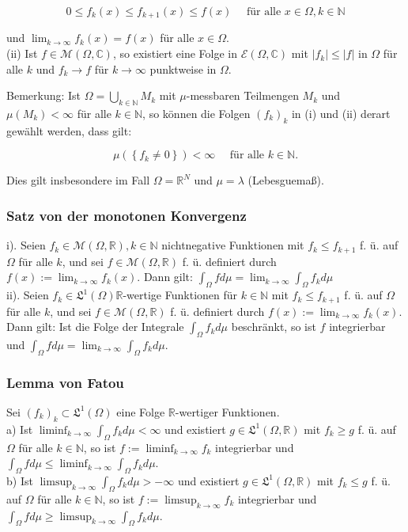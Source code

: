 \documentclass[10pt, letterpaper]{article}
\begin{document}
$$
0 \leq f_{k}(x) \leq f_{k+1}(x) \leq f(x) \quad \text { für alle } x \in \Omega, k \in \mathbb{N}
$$

und $\lim _{k \rightarrow \infty} f_{k}(x)=f(x)$ für alle $x \in \Omega$.\\
(ii) Ist $f \in \mathcal{M}(\Omega, \mathbb{C})$, so existiert eine Folge in $\mathcal{E}(\Omega, \mathbb{C})$ mit $\left|f_{k}\right| \leq|f|$ in $\Omega$ für alle $k$ und $f_{k} \rightarrow f$ für $k \rightarrow \infty$ punktweise in $\Omega$.

Bemerkung: Ist $\Omega=\bigcup_{k \in \mathbb{N}} M_{k}$ mit $\mu$-messbaren Teilmengen $M_{k}$ und $\mu\left(M_{k}\right)<\infty$ für alle $k \in \mathbb{N}$, so können die Folgen $\left(f_{k}\right)_{k}$ in (i) und (ii) derart gewählt werden, dass gilt:

$$
\mu\left(\left\{f_{k} \neq 0\right\}\right)<\infty \quad \text { für alle } k \in \mathbb{N} .
$$

Dies gilt insbesondere im Fall $\Omega=\mathbb{R}^{N}$ und $\mu=\lambda$ (Lebesguemaß).

\subsubsection*{Satz von der monotonen Konvergenz}
i). Seien $f_{k} \in \mathcal{M}(\Omega, \mathbb{R}), k \in \mathbb{N}$ nichtnegative Funktionen mit $f_{k} \leq f_{k+1}$ f. ü. auf $\Omega$ für alle $k$, und sei $f \in \mathcal{M}(\Omega, \mathbb{R})$ f. ü. definiert durch $f(x):=\lim _{k \rightarrow \infty} f_{k}(x)$. Dann gilt: $\int_{\Omega} f d \mu=\lim _{k \rightarrow \infty} \int_{\Omega} f_{k} d \mu$\\
ii). Seien $f_{k} \in \mathfrak{L}^{1}(\Omega) \mathbb{R}$-wertige Funktionen für $k \in \mathbb{N}$ mit $f_{k} \leq f_{k+1}$ f. ü. auf $\Omega$ für alle $k$, und sei $f \in \mathcal{M}(\Omega, \mathbb{R})$ f. ü. definiert durch $f(x):=\lim _{k \rightarrow \infty} f_{k}(x)$. Dann gilt: Ist die Folge der Integrale $\int_{\Omega} f_{k} d \mu$ beschränkt, so ist $f$ integrierbar und $\int_{\Omega} f d \mu=\lim _{k \rightarrow \infty} \int_{\Omega} f_{k} d \mu$.

\subsubsection*{Lemma von Fatou}
Sei $\left(f_{k}\right)_{k} \subset \mathfrak{L}^{1}(\Omega)$ eine Folge $\mathbb{R}$-wertiger Funktionen.\\
a) Ist $\liminf _{k \rightarrow \infty} \int_{\Omega} f_{k} d \mu<\infty$ und existiert $g \in \mathfrak{L}^{1}(\Omega, \mathbb{R})$ mit $f_{k} \geq g$ f. ü. auf $\Omega$ für alle $k \in \mathbb{N}$, so ist $f:=\liminf _{k \rightarrow \infty} f_{k}$ integrierbar und $\int_{\Omega} f d \mu \leq \liminf _{k \rightarrow \infty} \int_{\Omega} f_{k} d \mu$.\\
b) Ist $\limsup _{k \rightarrow \infty} \int_{\Omega} f_{k} d \mu>-\infty$ und existiert $g \in \mathfrak{L}^{1}(\Omega, \mathbb{R})$ mit $f_{k} \leq g$ f. ü. auf $\Omega$ für alle $k \in \mathbb{N}$, so ist $f:=\limsup _{k \rightarrow \infty} f_{k}$ integrierbar und $\int_{\Omega} f d \mu \geq \limsup _{k \rightarrow \infty} \int_{\Omega} f_{k} d \mu$.
\end{document}
